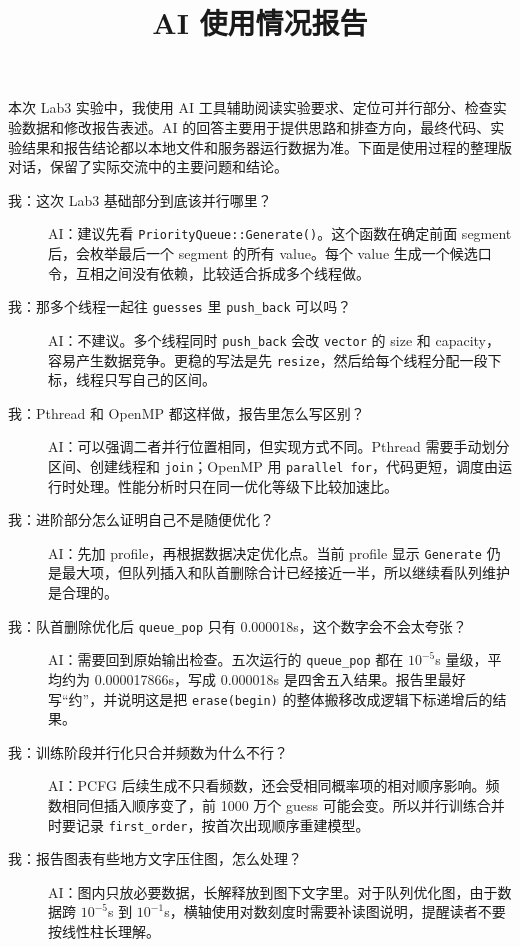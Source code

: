 \documentclass[UTF8,a4paper,12pt]{ctexart}
\title{AI 使用情况报告}
\author{}
\date{}
\begin{document}
\maketitle

本次 Lab3 实验中，我使用 AI 工具辅助阅读实验要求、定位可并行部分、检查实验数据和修改报告表述。AI 的回答主要用于提供思路和排查方向，最终代码、实验结果和报告结论都以本地文件和服务器运行数据为准。下面是使用过程的整理版对话，保留了实际交流中的主要问题和结论。

\begin{description}
  \item[我：这次 Lab3 基础部分到底该并行哪里？]
  AI：建议先看 \texttt{PriorityQueue::Generate()}。这个函数在确定前面 segment 后，会枚举最后一个 segment 的所有 value。每个 value 生成一个候选口令，互相之间没有依赖，比较适合拆成多个线程做。

  \item[我：那多个线程一起往 \texttt{guesses} 里 \texttt{push\_back} 可以吗？]
  AI：不建议。多个线程同时 \texttt{push\_back} 会改 \texttt{vector} 的 size 和 capacity，容易产生数据竞争。更稳的写法是先 \texttt{resize}，然后给每个线程分配一段下标，线程只写自己的区间。

  \item[我：Pthread 和 OpenMP 都这样做，报告里怎么写区别？]
  AI：可以强调二者并行位置相同，但实现方式不同。Pthread 需要手动划分区间、创建线程和 \texttt{join}；OpenMP 用 \texttt{parallel for}，代码更短，调度由运行时处理。性能分析时只在同一优化等级下比较加速比。

  \item[我：进阶部分怎么证明自己不是随便优化？]
  AI：先加 profile，再根据数据决定优化点。当前 profile 显示 \texttt{Generate} 仍是最大项，但队列插入和队首删除合计已经接近一半，所以继续看队列维护是合理的。

  \item[我：队首删除优化后 \texttt{queue\_pop} 只有 0.000018s，这个数字会不会太夸张？]
  AI：需要回到原始输出检查。五次运行的 \texttt{queue\_pop} 都在 $10^{-5}$s 量级，平均约为 0.000017866s，写成 0.000018s 是四舍五入结果。报告里最好写“约”，并说明这是把 \texttt{erase(begin)} 的整体搬移改成逻辑下标递增后的结果。

  \item[我：训练阶段并行化只合并频数为什么不行？]
  AI：PCFG 后续生成不只看频数，还会受相同概率项的相对顺序影响。频数相同但插入顺序变了，前 1000 万个 guess 可能会变。所以并行训练合并时要记录 \texttt{first\_order}，按首次出现顺序重建模型。

  \item[我：报告图表有些地方文字压住图，怎么处理？]
  AI：图内只放必要数据，长解释放到图下文字里。对于队列优化图，由于数据跨 $10^{-5}$s 到 $10^{-1}$s，横轴使用对数刻度时需要补读图说明，提醒读者不要按线性柱长理解。
\end{description}
\end{document}
